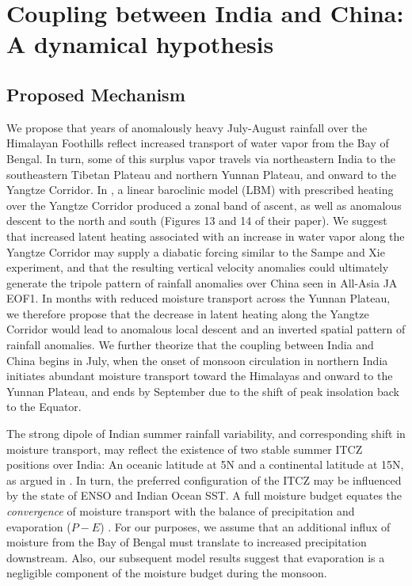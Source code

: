 \chapter{Coupling between India and China: A dynamical hypothesis}



\section{Proposed Mechanism}

	We propose that years of anomalously heavy July-August rainfall over the Himalayan Foothills reflect increased transport of water vapor from the Bay of Bengal. In turn, some of this surplus vapor travels via northeastern India to the southeastern Tibetan Plateau and northern Yunnan Plateau, and onward to the Yangtze Corridor. In \cite{Sampe2010}, a linear baroclinic model (LBM) with prescribed heating over the Yangtze Corridor produced a zonal band of ascent, as well as anomalous descent to the north and south (Figures 13 and 14 of their paper). We suggest that increased latent heating associated with an increase in water vapor along the Yangtze Corridor may supply a diabatic forcing similar to the Sampe and Xie experiment, and that the resulting vertical velocity anomalies could ultimately generate the tripole pattern of rainfall anomalies over China seen in All-Asia JA EOF1. In months with reduced moisture transport across the Yunnan Plateau, we therefore propose that the decrease in latent heating along the Yangtze Corridor would lead to anomalous local descent and an inverted spatial pattern of rainfall anomalies. We further theorize that the coupling between India and China begins in July, when the onset of monsoon circulation in northern India initiates abundant moisture transport toward the Himalayas and onward to the Yunnan Plateau, and ends by September due to the shift of peak insolation back to the Equator.
	
	The strong dipole of Indian summer rainfall variability, and corresponding shift in moisture transport, may reflect the existence of two stable summer ITCZ positions over India: An oceanic latitude at 5\textdegree N and a continental latitude at 15\textdegree N, as argued in \cite{Gadgil2003}. In turn, the preferred configuration of the ITCZ may be influenced by the state of ENSO and Indian Ocean SST. A full moisture budget equates the \textit{convergence} of moisture transport with the balance of precipitation and evaporation ($P-E$) \citep{Trenberth1991,Chen2014b}. For our purposes, we assume that an additional influx of moisture from the Bay of Bengal must translate to increased precipitation downstream. Also, our subsequent model results suggest that evaporation is a negligible component of the moisture budget during the monsoon.
		
